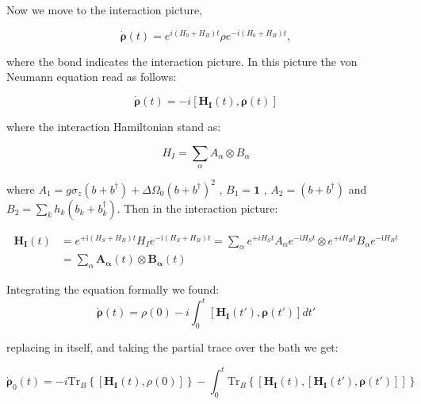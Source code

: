 \documentclass[%
preprint,
onecolumn,
notitlepag,
 amsmath,amssymb,
 aps,
 pra,
]{revtex4-2}
\newcommand{\tr}{\mbox{Tr}}
\begin{document}
\begin{itemize}
Now we move to the interaction picture, 

\begin{equation}
  \dot{\boldsymbol{\rho}}(t) = e^{i (H_0+H_B) t} \rho e^{-i (H_0+H_B) t},
\end{equation}

where the bond indicates the interaction picture. In this picture the von Neumann equation read as follows:

\begin{equation}
  \dot{\boldsymbol{\rho}}(t) = -i \left[  \mathbf{H_I}(t) ,  \boldsymbol{\rho}(t)\right]
\end{equation}

where the interaction Hamiltonian stand as: 

\begin{equation}
H_{I}=\sum_{\alpha} A_{\alpha} \otimes B_{\alpha}
\end{equation}

where $A_1= g \sigma_z  \left( b + b ^{\dagger} \right) +  \Delta \Omega_0 \left( b + b ^{\dagger} \right)^2  $ , $B_1= \mathbf{1}$ , $A_2= \left( b + b ^{\dagger} \right) $ and $B_2= \sum_k h_k \left( b_k + b_k ^{\dagger} \right)$. Then in the interaction picture: 

\begin{equation}
\begin{aligned}
\boldsymbol{H}_{\boldsymbol{I}}(t) &=e^{+\mathrm{i}\left(H_{S}+H_{B}\right) t} H_{I} e^{-\mathrm{i}\left(H_{S}+H_{B}\right) t}=\sum_{\alpha} e^{+i H_{S} t} A_{\alpha} e^{-\mathrm{i} H_{S} t} \otimes e^{+i H_{B} t} B_{\alpha} e^{-\mathrm{i} H_{B} t} \\
&=\sum_{\alpha} \boldsymbol{A}_{\boldsymbol{\alpha}}(t) \otimes \boldsymbol{B}_{\boldsymbol{\alpha}}(t)
\end{aligned}
\end{equation}

Integrating the equation formally we found:
\begin{equation}
 \dot{\boldsymbol{\rho}}(t)= \rho(0)  -i \int_0^t \left[  \mathbf{H_I}(t') ,  \boldsymbol{\rho}(t')\right] dt' 
 \label{1 integral}
\end{equation}



replacing in itself, and taking the partial trace over the bath we get:

\begin{equation}
\dot{\boldsymbol{\rho}}_0(t) = -i  \tr_{B} \left\{\left[  \mathbf{H_I}(t) ,  \rho(0)\right] \right\} - \int_0 ^t \tr_B  \left\{ [ \mathbf{H_I}(t), [  \mathbf{H_I}(t') ,  \boldsymbol{\rho}(t') ]] \right\} 
\end{equation}


\end{itemize}
\end{document}
